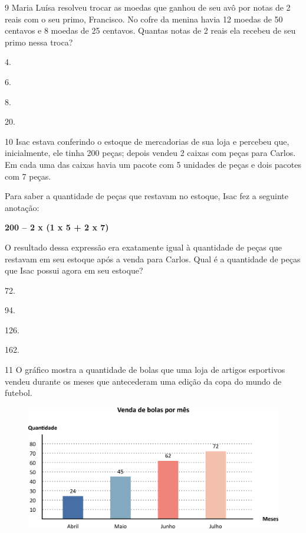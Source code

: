 \pagebreak

\num{9} Maria Luísa resolveu trocar as moedas que ganhou de seu avô por notas de
2 reais com o seu primo, Francisco. No cofre da menina havia 12 moedas de 50
centavos e 8 moedas de 25 centavos. Quantas notas de 2 reais ela recebeu
de seu primo nessa troca?

\begin{escolha}
\item
  4.
\item
  6.
\item
  8.
\item
  20.
\end{escolha}

\num{10} Isac estava conferindo o estoque de mercadorias de sua loja e percebeu que, inicialmente, ele tinha 200 peças; depois vendeu 2 caixas com peças para Carlos. Em cada uma das caixas havia um pacote com 5 unidades de peças e dois pacotes com 7 peças.

Para saber a quantidade de peças que restavam no estoque, Isac fez a seguinte anotação:

\begin{myquote}
\centering
\textbf{200 -- 2 x (1 x 5 + 2 x 7)}
\end{myquote}

O resultado dessa expressão era exatamente igual à quantidade de peças que restavam em seu estoque após a venda para Carlos. Qual é a quantidade de peças que Isac possui agora em seu estoque?

\begin{multicols}{2}
\begin{escolha}
\item
  72.
\item
  94.
\item
  126.
\item
  162.
\end{escolha}
\end{multicols}

\pagebreak

\num{11} O gráfico mostra a quantidade de bolas que uma loja de artigos esportivos vendeu durante os meses que antecederam uma edição da copa do mundo de futebol.

\begin{figure}[htpb!]
\centering
\includegraphics[width=\textwidth]{./media/image105.png}
\end{figure}

